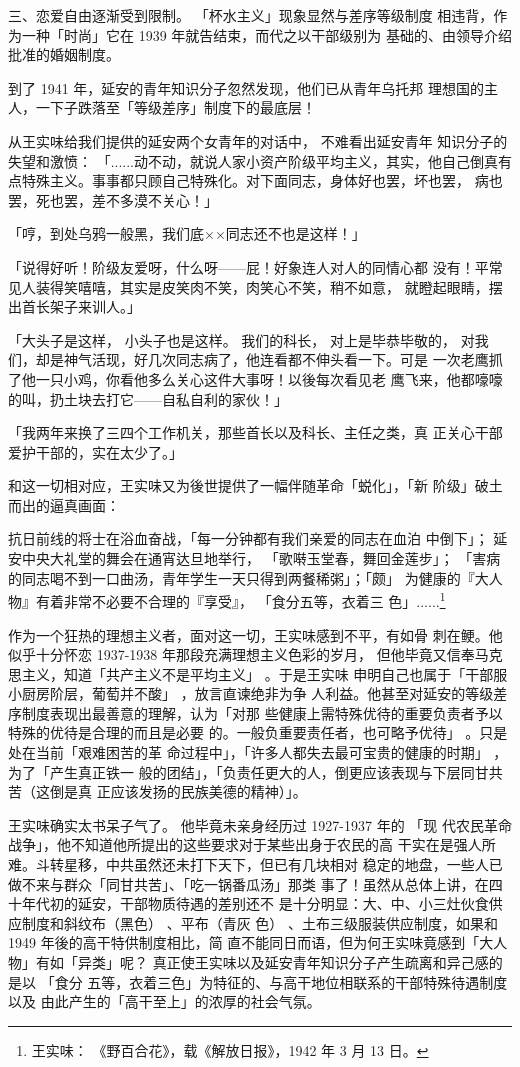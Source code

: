 三、恋爱自由逐渐受到限制。
「杯水主义」现象显然与差序等级制度
相违背，作为一种「时尚」它在 1939 年就告结束，而代之以干部级别为
基础的、由领导介绍批准的婚姻制度。

到了 1941 年，延安的青年知识分子忽然发现，他们已从青年乌托邦
理想国的主人，一下子跌落至「等级差序」制度下的最底层！

从王实味给我们提供的延安两个女青年的对话中，
不难看出延安青年
知识分子的失望和激愤：
「......动不动，就说人家小资产阶级平均主义，其实，他自己倒真有
点特殊主义。事事都只顾自己特殊化。对下面同志，身体好也罢，坏也罢，
病也罢，死也罢，差不多漠不关心！」

「哼，到处乌鸦一般黑，我们底××同志还不也是这样！」

「说得好听！阶级友爱呀，什么呀——屁！好象连人对人的同情心都
没有！平常见人装得笑嘻嘻，其实是皮笑肉不笑，肉笑心不笑，稍不如意，
就瞪起眼睛，摆出首长架子来训人。」

「大头子是这样，
小头子也是这样。
我们的科长，
对上是毕恭毕敬的，
对我们，却是神气活现，好几次同志病了，他连看都不伸头看一下。可是
一次老鹰抓了他一只小鸡，你看他多么关心这件大事呀！以後每次看见老
鹰飞来，他都嚎嚎的叫，扔土块去打它——自私自利的家伙！」

「我两年来换了三四个工作机关，那些首长以及科长、主任之类，真
正关心干部爱护干部的，实在太少了。」

和这一切相对应，王实味又为後世提供了一幅伴随革命「蜕化」，「新
阶级」破土而出的逼真画面：

抗日前线的将士在浴血奋战，「每一分钟都有我们亲爱的同志在血泊
中倒下」；
延安中央大礼堂的舞会在通宵达旦地举行，
「歌啭玉堂春，舞回金莲步」；
「害病的同志喝不到一口曲汤，青年学生一天只得到两餐稀粥」；「颇」
为健康的『大人物』有着非常不必要不合理的『享受』，
「食分五等，衣着三
色」......\footnote{王实味：
《野百合花》，载《解放日报》，1942 年 3 月 13 日。} 

作为一个狂热的理想主义者，面对这一切，王实味感到不平，有如骨
刺在鲠。他似乎十分怀恋 1937-1938 年那段充满理想主义色彩的岁月，
但他毕竟又信奉马克思主义，知道「共产主义不是平均主义」
。于是王实味
申明自己也属于「干部服小厨房阶层，葡萄并不酸」
，放言直谏绝非为争
人利益。他甚至对延安的等级差序制度表现出最善意的理解，认为「对那
些健康上需特殊优待的重要负责者予以特殊的优待是合理的而且是必要
的。一般负重要责任者，也可略予优待」
。只是处在当前「艰难困苦的革
命过程中」，「许多人都失去最可宝贵的健康的时期」
，为了「产生真正铁一
般的团结」，「负责任更大的人，倒更应该表现与下层同甘共苦（这倒是真
正应该发扬的民族美德的精神）」。

王实味确实太书呆子气了。
他毕竟未亲身经历过 1927-1937 年的
「现
代农民革命战争」，他不知道他所提出的这些要求对于某些出身于农民的高
干实在是强人所难。斗转星移，中共虽然还未打下天下，但已有几块相对
稳定的地盘，一些人已做不来与群众「同甘共苦」、「吃一锅番瓜汤」那类
事了！虽然从总体上讲，在四十年代初的延安，干部物质待遇的差别还不
是十分明显：大、中、小三灶伙食供应制度和斜纹布（黑色）
、平布（青灰
色）
、土布三级服装供应制度，如果和 1949 年後的高干特供制度相比，简
直不能同日而语，但为何王实味竟感到「大人物」有如「异类」呢？
真正使王实味以及延安青年知识分子产生疏离和异己感的是以
「食分
五等，衣着三色」为特征的、与高干地位相联系的干部特殊待遇制度以及
由此产生的「高干至上」的浓厚的社会气氛。

